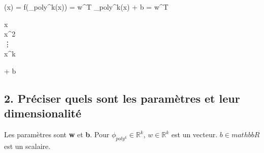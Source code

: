 \documentclass[12pt]{article}
\newenvironment{eqs*}{\begin{equation*}\begin{aligned}}{\end{aligned}\end{equation*}}
\begin{document}
	\begin{eqs*}
		(x) = f(\phi_{poly^{k}}(x)) = w^{T} \phi_{poly^{k}}(x) + b = w^{T}\begin{bmatrix}
																			x \\
																			x^{2} \\
																			\vdots \\
																			x^{k}
																			\end{bmatrix} + b
	\end{eqs*}


\subsection{2. Préciser quels sont les paramètres et leur dimensionalité}

Les paramètres sont \textbf{w} et \textbf{b}. Pour $\phi_{poly^{k}} \in \mathbb{R}^{k}$, $w \in \mathbb{R}^{k}$ est un vecteur. $b \in mathbb{R}$ est un scalaire.
\end{document}
